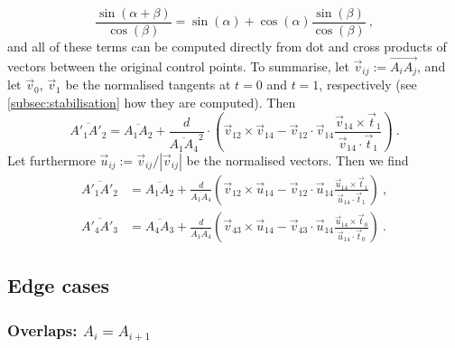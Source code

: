 \documentclass[12pt,a4paper]{article}
\theoremstyle{definition}
\newcommand{\tv}{\vec{t}}
\newcommand{\uv}{\vec{u}}
\newcommand{\vv}{\vec{v}}
\begin{document}
\begin{equation}
  \frac{\sin(\alpha + \beta)}{\cos(\beta)} = \sin(\alpha) + \cos(\alpha) \frac{\sin(\beta)}{\cos(\beta)} \ ,
\end{equation}
and all of these terms can be computed directly from dot and cross products of vectors between the original control points. To summarise, let $\vv_{ij} := \overrightarrow{A_iA_j}$, and let $\vv_0$, $\vv_1$ be the normalised tangents at $t=0$ and $t=1$, respectively (see \cref{subsec:stabilisation} how they are computed). Then
\begin{equation}
  \overline{A'_1A'_2} = \overline{A_1A_2} + \frac{d}{\overline{A_1A_4}^2}\cdot\left(\vv_{12} \times \vv_{14} - \vv_{12}\cdot\vv_{14} \frac{\vv_{14}\times\tv_1}{\vv_{14}\cdot\tv_1} \right) \ .
\end{equation}
Let furthermore $\uv_{ij} := \vv_{ij}/|\vv_{ij}|$ be the normalised vectors. Then we find
\begin{equation}%
  \label{eq:finalPrimeDistance}
  \begin{aligned}
    \overline{A'_1A'_2} &= \overline{A_1A_2} + \frac{d}{\overline{A_1A_4}} \left(\vv_{12} \times \uv_{14} - \vv_{12}\cdot\uv_{14} \frac{\uv_{14}\times\tv_1}{\uv_{14}\cdot\tv_1} \right) \ , \\
    \overline{A'_4A'_3} &= \overline{A_4A_3} + \frac{d}{\overline{A_1A_4}} \left(\vv_{43} \times \uv_{14} - \vv_{43}\cdot\uv_{14} \frac{\uv_{14}\times\tv_0}{\uv_{14}\cdot\tv_0} \right) \ .
  \end{aligned}
\end{equation}



\subsection{Edge cases}

\subsubsection{Overlaps: \texorpdfstring{$A_i = A_{i+1}$}{A\_i = A\_(i+1)}}
\end{document}
